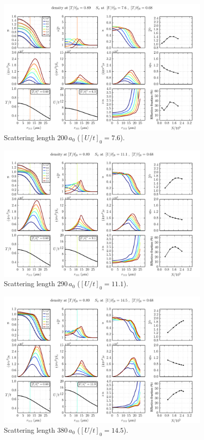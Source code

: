 \documentclass[11pt,letter]{article}
\begin{document}
\begin{figure}[H]
    \centering
\includegraphics[width=0.95\textwidth]{figures/200a0_hot.png}
\caption{Scattering length 200\,$a_{0}$ ($[U/t]_{0}=7.6$).  } 
\label{fig:200a0_varyNhot}
\end{figure}
\begin{figure}[H]
    \centering
\includegraphics[width=0.95\textwidth]{figures/290a0_hot.png}
\caption{Scattering length 290\,$a_{0}$ ($[U/t]_{0}=11.1$).   } 
\label{fig:290a0_varyNhot}
\end{figure}
\begin{figure}[H]
    \centering
\includegraphics[width=0.95\textwidth]{figures/380a0_hot.png}
\caption{Scattering length 380\,$a_{0}$ ($[U/t]_{0}=14.5$).   } 
\label{fig:380a0_varyNhot}
\end{figure}
\end{document}
